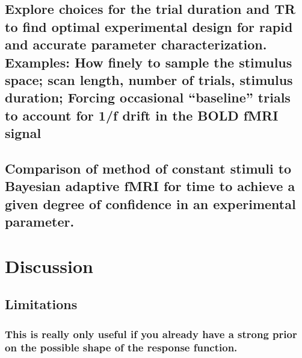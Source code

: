 \documentclass[
  man,floatsintext]{apa6}
\begin{document}
\hypertarget{explore-choices-for-the-trial-duration-and-tr-to-find-optimal-experimental-design-for-rapid-and-accurate-parameter-characterization.-examples-how-finely-to-sample-the-stimulus-space-scan-length-number-of-trials-stimulus-duration-forcing-occasional-baseline-trials-to-account-for-1f-drift-in-the-bold-fmri-signal}{%
\subsection{Explore choices for the trial duration and TR to find optimal experimental design for rapid and accurate parameter characterization. Examples: How finely to sample the stimulus space; scan length, number of trials, stimulus duration; Forcing occasional ``baseline'' trials to account for 1/f drift in the BOLD fMRI signal}\label{explore-choices-for-the-trial-duration-and-tr-to-find-optimal-experimental-design-for-rapid-and-accurate-parameter-characterization.-examples-how-finely-to-sample-the-stimulus-space-scan-length-number-of-trials-stimulus-duration-forcing-occasional-baseline-trials-to-account-for-1f-drift-in-the-bold-fmri-signal}}

\hypertarget{comparison-of-method-of-constant-stimuli-to-bayesian-adaptive-fmri-for-time-to-achieve-a-given-degree-of-confidence-in-an-experimental-parameter.}{%
\subsection{Comparison of method of constant stimuli to Bayesian adaptive fMRI for time to achieve a given degree of confidence in an experimental parameter.}\label{comparison-of-method-of-constant-stimuli-to-bayesian-adaptive-fmri-for-time-to-achieve-a-given-degree-of-confidence-in-an-experimental-parameter.}}

\hypertarget{discussion}{%
\section{Discussion}\label{discussion}}

\hypertarget{limitations}{%
\subsection{Limitations}\label{limitations}}

\hypertarget{this-is-really-only-useful-if-you-already-have-a-strong-prior-on-the-possible-shape-of-the-response-function.}{%
\subsubsection{This is really only useful if you already have a strong prior on the possible shape of the response function.}\label{this-is-really-only-useful-if-you-already-have-a-strong-prior-on-the-possible-shape-of-the-response-function.}}
\end{document}

